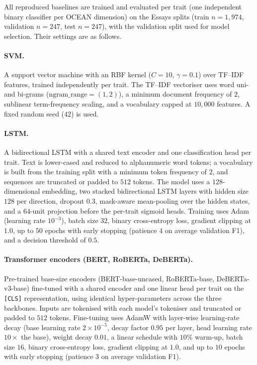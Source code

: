 \documentclass[../main.tex]{subfiles}
\begin{document}
All reproduced baselines are trained and evaluated per trait (one independent
binary classifier per OCEAN dimension) on the Essays splits
(train $n=1{,}974$, validation $n=247$, test $n=247$), with the validation
split used for model selection. Their settings are as follows.

\paragraph{SVM.}
A support vector machine with an RBF kernel ($C=10$, $\gamma=0.1$) over TF--IDF
features, trained independently per trait. The TF--IDF vectoriser uses word uni-
and bi-grams ($\text{ngram\_range}=(1,2)$), a minimum document frequency of $2$,
sublinear term-frequency scaling, and a vocabulary capped at $10{,}000$
features. A fixed random seed ($42$) is used.

\paragraph{LSTM.}
A bidirectional LSTM with a shared text encoder and one classification head per
trait. Text is lower-cased and reduced to alphanumeric word tokens; a
vocabulary is built from the training split with a minimum token frequency of
$2$, and sequences are truncated or padded to $512$ tokens. The model uses a
$128$-dimensional embedding, two stacked bidirectional LSTM layers with hidden
size $128$ per direction, dropout $0.3$, mask-aware mean-pooling over the hidden
states, and a $64$-unit projection before the per-trait sigmoid heads.
Training uses Adam (learning rate $10^{-3}$), batch size $32$, binary
cross-entropy loss, gradient clipping at $1.0$, up to $50$ epochs with early
stopping (patience $4$ on average validation F1), and a decision threshold of
$0.5$.

\paragraph{Transformer encoders (BERT, RoBERTa, DeBERTa).}
Pre-trained base-size encoders (BERT-base-uncased, RoBERTa-base,
DeBERTa-v3-base) fine-tuned with a shared encoder and one linear head per
trait on the \texttt{[CLS]} representation, using identical hyper-parameters
across the three backbones. Inputs are tokenised with each model's tokeniser and truncated
or padded to $512$ tokens. Fine-tuning uses AdamW with layer-wise
learning-rate decay (base learning rate $2\times10^{-5}$, decay factor $0.95$
per layer, head learning rate $10\times$ the base), weight decay $0.01$, a
linear schedule with $10\%$ warm-up, batch size $16$, binary cross-entropy
loss, gradient clipping at $1.0$, and up to $10$ epochs
with early stopping (patience $3$ on average validation F1).
\end{document}
